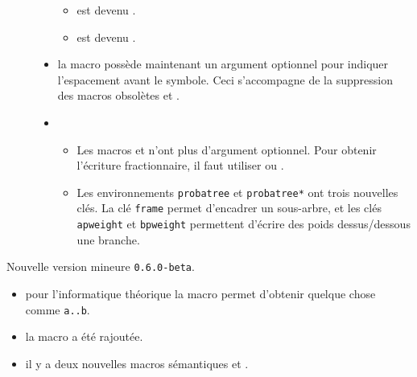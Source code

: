 \documentclass[12pt,a4paper]{book}
\begin{document}
\begin{description}
\begin{itemize}[itemsep=.5em]
\begin{itemize}[itemsep=.5em]
        \item {} est devenu .

        \item {} est devenu .
    \end{itemize}




    \item {}
	      la macro  possède maintenant un argument optionnel pour indiquer l'espacement avant le symbole.
          Ceci s'accompagne de la suppression des macros obsolètes  et .




    \item {}
    \begin{itemize}[itemsep=.5em]
        \item Les macros  et  n'ont plus d'argument optionnel. Pour obtenir l'écriture fractionnaire, il faut utiliser  ou .

        \item Les environnements \verb+probatree+ et \verb+probatree*+ ont trois nouvelles clés.
              La clé \verb+frame+ permet d'encadrer un sous-arbre, et les clés \verb+apweight+ et \verb+bpweight+ permettent d'écrire des poids dessus/dessous une branche.
    \end{itemize}
\end{itemize}

\end{description}\begin{description}
\medskip
\item[2019-10-10] Nouvelle version mineure \verb+0.6.0-beta+.

\begin{itemize}[itemsep=.5em]
    \item {}
    	  pour l'informatique théorique la macro  permet d'obtenir quelque chose comme \verb+a..b+.




    \item {}
          la macro  a été rajoutée.




    \item {}
          il y a deux nouvelles macros sémantiques  et .



\end{itemize}
\end{description}
\end{document}
